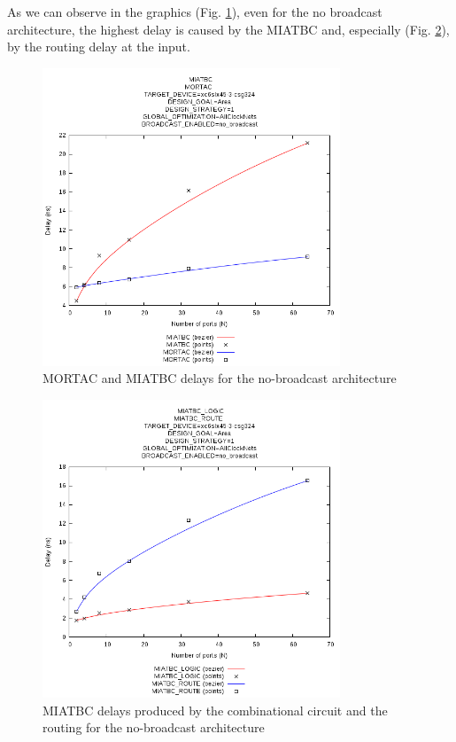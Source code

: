 \documentclass[conference,a4paper]{IEEEtran}
\begin{document}
As we can observe in the graphics (Fig. \ref{miatbc_vs_mortac_no_broadcast}), even for the no broadcast architecture, the highest delay is caused by the MIATBC and, especially (Fig. \ref{miatbc_delays_no_broadcast}), by the routing delay at the input.

\begin{figure}[h]
\centering
\includegraphics[width=3.5in]{miatbc_vs_mortac_no_broadcast}
\caption{MORTAC and MIATBC delays for the no-broadcast architecture}
\label{miatbc_vs_mortac_no_broadcast}
\end{figure}

\begin{figure}[h]
\centering
\includegraphics[width=3.5in]{miatbc_delays_no_broadcast}
\caption{MIATBC delays produced by the combinational circuit and the routing for the no-broadcast architecture}
\label{miatbc_delays_no_broadcast}
\end{figure}
\end{document}
